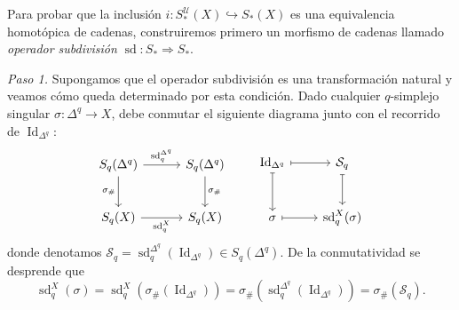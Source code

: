 \begin{dem}
Para probar que la inclusión $i \colon S_*^{\mathcal{U}}(X) \hookrightarrow S_*(X)$ es una equivalencia homotópica de cadenas, construiremos primero un morfismo de cadenas llamado \textit{operador subdivisión} $\operatorname{sd} \colon S_* \Rightarrow S_*$.

\smallskip
\noindent\textit{Paso 1.} Supongamos que el operador subdivisión es una transformación natural y veamos cómo queda determinado por esta condición. Dado cualquier $q$-simplejo singular $\sigma \colon \Delta^q \to X$, debe conmutar el siguiente diagrama junto con el recorrido de $\operatorname{Id}_{\Delta^q}$:
\[
\begin{tikzcd}[column sep=3.0em, row sep=2.5em]
S_q(\Delta^q) \arrow[r, "\operatorname{sd}_q^{\Delta^q}"] \arrow[d, "\sigma_\#"'] & S_q(\Delta^q) \arrow[d, "\sigma_\#"] \\
S_q(X) \arrow[r, "\operatorname{sd}_q^X"'] & S_q(X)
\end{tikzcd}
\hspace{2em}
\begin{tikzcd}[column sep=2.2em, row sep=2.5em]
\operatorname{Id}_{\Delta^q} \arrow[r, mapsto] \arrow[d, mapsto] & \mathcal{S}_q \arrow[d, mapsto] \\
\sigma \arrow[r, mapsto] & \operatorname{sd}_q^X(\sigma)
\end{tikzcd}
\]
donde denotamos $\mathcal{S}_q = \operatorname{sd}_q^{\Delta^q}(\operatorname{Id}_{\Delta^q}) \in S_q(\Delta^q)$. De la conmutatividad se desprende que
\[
\operatorname{sd}_q^X(\sigma) = \operatorname{sd}_q^X(\sigma_\#(\operatorname{Id}_{\Delta^q})) = \sigma_\#\!\left(\operatorname{sd}_q^{\Delta^q}(\operatorname{Id}_{\Delta^q})\right) = \sigma_\#(\mathcal{S}_q).
\]


\end{dem}
